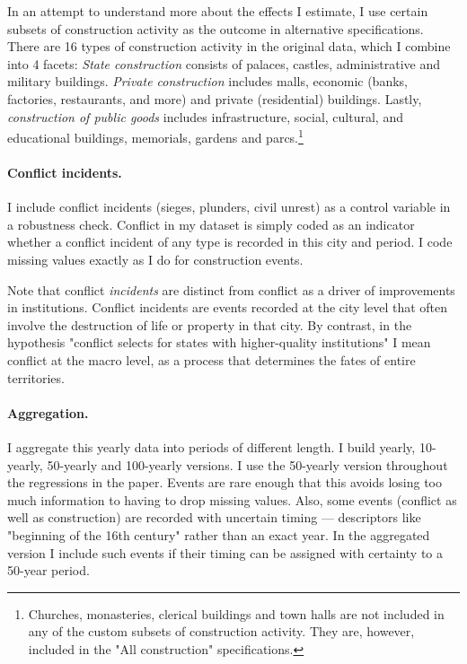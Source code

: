 \documentclass[11pt, a4paper]{article}
\begin{document}
In an attempt to understand more about the effects I estimate, I use certain subsets of construction activity as the outcome in alternative specifications. There are 16 types of construction activity in the original data, which I combine into 4 facets: \textit{State construction} consists of palaces, castles, administrative and military buildings. \textit{Private construction} includes malls, economic (banks, factories, restaurants, and more) and private (residential) buildings. Lastly, \textit{construction of public goods} includes infrastructure, social, cultural, and educational buildings, memorials, gardens and parcs.\footnote
{
Churches, monasteries, clerical buildings and town halls are not included in any of the custom subsets of construction activity. They are, however, included in the "All construction" specifications.
}


\paragraph{Conflict incidents.}

I include conflict incidents (sieges, plunders, civil unrest) as a control variable in a robustness check. Conflict in my dataset is simply coded as an indicator whether a conflict incident of any type is recorded in this city and period. I code missing values exactly as I do for construction events.

Note that conflict \textit{incidents} are distinct from conflict as a driver of improvements in institutions. Conflict incidents are events recorded at the city level that often involve the destruction of life or property in that city. By contrast, in the hypothesis "conflict selects for states with higher-quality institutions" I mean conflict at the macro level, as a process that determines the fates of entire territories.

\paragraph{Aggregation.}

I aggregate this yearly data into periods of different length. I build yearly, 10-yearly, 50-yearly and 100-yearly versions. I use the 50-yearly version throughout the regressions in the paper. Events are rare enough that this avoids losing too much information to having to drop missing values. Also, some events (conflict as well as construction) are recorded with uncertain timing --- descriptors like "beginning of the 16th century" rather than an exact year. In the aggregated version I include such events if their timing can be assigned with certainty to a 50-year period.
\end{document}

